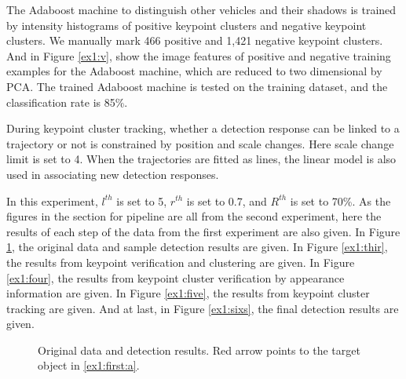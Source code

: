  The Adaboost machine to distinguish other vehicles and their shadows is trained by intensity histograms of positive keypoint clusters and negative keypoint clusters. We manually mark 466 positive  and 1,421 negative keypoint clusters. And in Figure \ref{ex1:v}, show the image features of positive and negative training examples for the Adaboost machine, which are reduced to two dimensional by PCA. The trained Adaboost machine is tested on the training dataset, and the classification rate is 85\%.

During keypoint cluster tracking, whether a detection response can be linked to a trajectory or not is constrained by position and scale changes. Here scale change limit is set to 4. When the trajectories are fitted as lines, the linear model is also used in associating new detection responses.


In this experiment, $l^{th}$ is set to 5, $r^{th}$ is set to 0.7, and $R^{th}$ is set to 70\%. As the figures in the section for pipeline are all from the second experiment, here the results of each step of the data from the first experiment are also given. In Figure \ref{ex1:first}, the original data and sample detection results are given. In Figure \ref{ex1:thir}, the results from keypoint verification and clustering are given. In Figure \ref{ex1:four}, the results from keypoint cluster verification by appearance information are given. In Figure \ref{ex1:five}, the results from keypoint cluster tracking are given. And at last, in Figure \ref{ex1:sixs}, the final detection results are given.

\begin{figure}
\centering
{}
\caption[Original data and detection results]{Original data and detection results. Red arrow points to the target object in \ref{ex1:first:a}.}
\label{ex1:first}
\end{figure}

